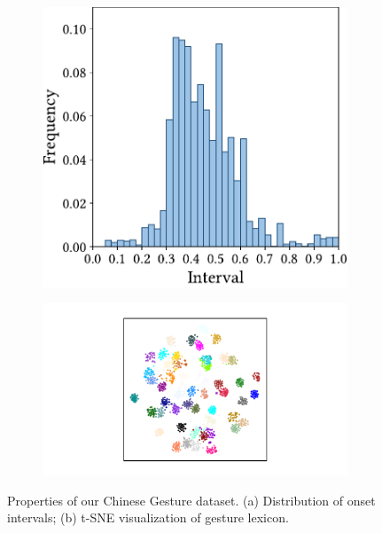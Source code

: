 \begin{figure}[t]
    \centering   
    \begin{subfigure}[t]{0.433\linewidth}
         \centering
         \includegraphics[width=\linewidth]{figures/onset_interval_ours.pdf}
         \caption{}
         \label{fig:onset_intervals_Chinese}
    \end{subfigure}
    \hspace{0.06\linewidth}
    \begin{subfigure}[t]{0.40\linewidth}
         \centering
         \includegraphics[width=\linewidth]{figures/tsne_Chinese.pdf}
         \caption{}
         \label{fig:lexicon_tsne_Chinese}
    \end{subfigure}
    \caption{Properties of our Chinese Gesture dataset. (a) Distribution of onset intervals; (b) t-SNE visualization of gesture lexicon.} 
    \Description{}
\end{figure}

